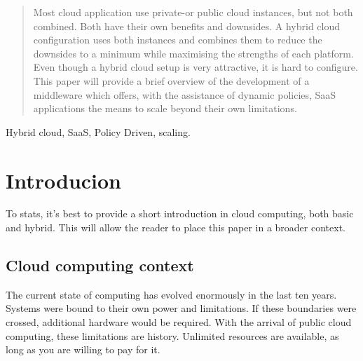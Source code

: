 \documentclass[journal]{IEEEtran}
\begin{document}







\maketitle


\begin{abstract}
Most cloud application use private-or public cloud instances, but not both combined.
Both have their own benefits and downsides.
A hybrid cloud configuration uses both instances and combines them to reduce the downsides to a minimum while maximising the strengths of each platform.
Even though a hybrid cloud setup is very attractive, it is hard to configure.
This paper will provide a brief overview of the development of a middleware which offers, with the assistance of dynamic policies, SaaS applications the means to scale beyond their own limitations.
\end{abstract}

\begin{IEEEkeywords}
Hybrid cloud, SaaS, Policy Driven, scaling.
\end{IEEEkeywords}

\IEEEpeerreviewmaketitle



\section{Introducion}
To stats, it's best to provide a short introduction in cloud computing, both basic and hybrid.
This will allow the reader to place this paper in a broader context.
\subsection{Cloud computing context}
The current state of computing has evolved enormously in the last ten years.
Systems were bound to their own power and limitations.
If these boundaries were crossed, additional hardware would be required.
With the arrival of public cloud computing, these limitations are history.
Unlimited resources are available, as long as you are willing to pay for it.\newline
\end{document}
